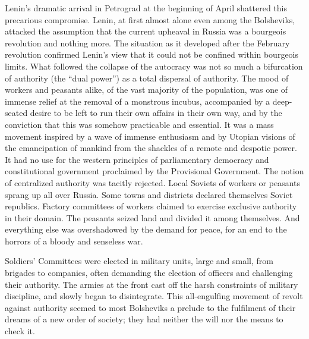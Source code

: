 Lenin's dramatic arrival in Petrograd at the beginning of April shattered this precarious compromise. Lenin, at first almost alone even among the Bolsheviks, attacked the assumption that the current upheaval in Russia was a bourgeois revolution and nothing more. The situation as it developed after the February revolution confirmed Lenin's view that it could not be confined within bourgeois limits. What followed the collapse of the autocracy was not so much a bifurcation of authority (the ``dual power'') as a total dispersal of authority. The mood of workers and peasants alike, of the vast majority of the population, was one of immense relief at the removal of a monstrous incubus, accompanied by a deep-seated desire to be left to run their own affairs in their own way, and by the conviction that this was somehow practicable and essential. It was a mass movement inspired by a wave of immense enthusiasm and by Utopian visions of the emancipation of mankind from the shackles of a remote and despotic power. It had no use for the western principles of parliamentary democracy and constitutional government proclaimed by the Provisional Government. The notion of centralized authority was tacitly rejected. Local Soviets of workers or peasants sprang up all over Russia. Some towns and districts declared themselves Soviet republics. Factory committees of workers claimed to exercise exclusive authority in their domain. The peasants seized land and divided it among themselves. And everything else was overshadowed by the demand for peace, for an end to the horrors of a bloody and senseless war. 

Soldiers' Committees were elected in military units, large and small, from brigades to companies, often demanding the election of officers and challenging their authority. The armies at the front cast off the harsh constraints of military discipline, and slowly began to disintegrate. This all-engulfing movement of revolt against authority seemed to most Bolsheviks a prelude to the fulfilment of their dreams of a new order of society; they had neither the will nor the means to check it. 


